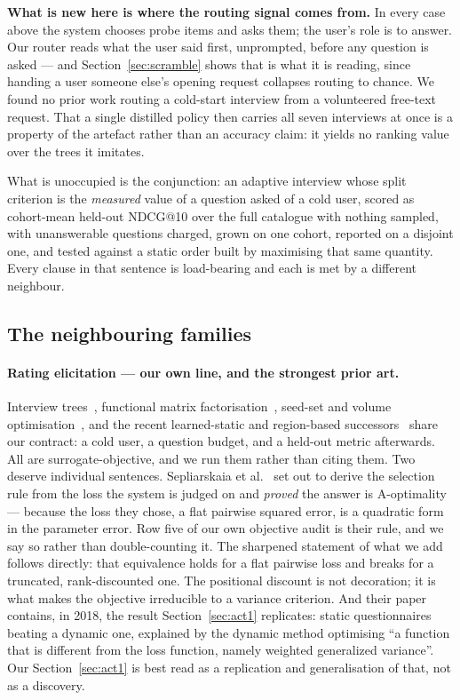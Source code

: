 \documentclass[11pt]{article}
\begin{document}
\textbf{What is new here is where the routing signal comes from.} In every
case above the system chooses probe items and asks them; the user's role is to answer. Our router
reads what the user said first, unprompted, before any question is asked --- and
Section~\ref{sec:scramble} shows that is what it is reading, since handing a user someone else's
opening request collapses routing to chance. We found no prior work routing a cold-start interview
from a volunteered free-text request. That a single distilled policy then carries all seven
interviews at once is a property of the artefact rather than an accuracy claim: it yields no ranking
value over the trees it imitates.

What is unoccupied is the conjunction: an adaptive interview whose split criterion is the
\emph{measured} value of a question asked of a cold user, scored as cohort-mean held-out NDCG@10 over
the full catalogue with nothing sampled, with unanswerable questions charged, grown on one cohort,
reported on a disjoint one, and tested against a static order built by maximising that same quantity.
Every clause in that sentence is load-bearing and each is met by a different neighbour.

\subsection{The neighbouring families}

\paragraph{Rating elicitation --- our own line, and the strongest prior art.} Interview
trees~\cite{golbandi2011adaptive,hu2013interview,sun2013learning}, functional matrix
factorisation~\cite{zhou2011functional}, seed-set and volume
optimisation~\cite{liu2011wisdom,fonarev2016rectangular,anava2015budget}, and the recent
learned-static and region-based successors~\cite{kweon2020deep,nguyen2024pere,parapar2021dpe} share
our contract: a cold user, a question budget, and a held-out metric afterwards. All are
surrogate-objective, and we run them rather than citing them. Two deserve individual sentences.
Sepliarskaia et al.~\cite{sepliarskaia2018spq} set out to derive the selection rule from the loss the
system is judged on and \emph{proved} the answer is A-optimality --- because the loss they chose, a
flat pairwise squared error, is a quadratic form in the parameter error. Row five of our own
objective audit is their rule, and we say so rather than double-counting it. The sharpened statement
of what we add follows directly: that equivalence holds for a flat pairwise loss and breaks for a
truncated, rank-discounted one. The positional discount is not decoration; it is what makes the
objective irreducible to a variance criterion. And their paper contains, in 2018, the result Section~\ref{sec:act1}
replicates: static questionnaires beating a dynamic one, explained by the dynamic method optimising
``a function that is different from the loss function, namely weighted generalized variance''. Our
Section~\ref{sec:act1} is best read as a replication and generalisation of that, not as a discovery.
\end{document}
